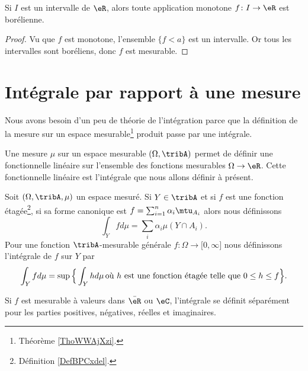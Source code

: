 \begin{corollary}
    Si \( I\) est un intervalle de \( \eR\), alors toute application monotone \( f\colon I\to \eR\) est borélienne.
\end{corollary}

\begin{proof}
    Vu que \( f\) est monotone, l'ensemble \( \{ f<a \}\) est un intervalle. Or tous les intervalles sont boréliens, donc \( f\) est mesurable.
\end{proof}

\section{Intégrale par rapport à une mesure}

Nous avons besoin d'un peu de théorie de l'intégration parce que la définition de la mesure sur un espace mesurable\footnote{Théorème \ref{ThoWWAjXzi}.} produit passe par une intégrale.

Une mesure \( \mu\) sur un espace mesurable \( (\Omega,\tribA)\) permet de définir une fonctionnelle linéaire sur l'ensemble des fonctions mesurables \( \Omega\to \eR\). Cette fonctionnelle linéaire est l'intégrale que nous allons définir à présent.

\begin{definition}  \label{DefTVOooleEst}
    Soit \( (\Omega,\tribA,\mu)\) un espace mesuré. Si \( Y\in \tribA\) et si \( f\) est une fonction étagée\footnote{Définition \ref{DefBPCxdel}.}, si sa forme canonique est \( f=\sum_{i=1}^n\alpha_i\mtu_{A_i}\) alors nous définissons
    \begin{equation}
        \int_Yfd\mu=\sum_i\alpha_i\mu(Y\cap A_i).
    \end{equation}
    Pour une fonction \( \tribA\)-mesurable générale \( f\colon \Omega\to \mathopen[ 0 , \infty \mathclose]\) nous définissons l'intégrale de \( f\) sur \( Y\) par
    \begin{equation}        \label{EqDefintYfdmu}
        \int_Yfd\mu=\sup\Big\{ \int_Yhd\mu\,\text{où \( h\) est une fonction étagée telle que \( 0\leq h\leq f\)} \Big\}.
    \end{equation}

    Si $f$ est mesurable à valeurs dans \( \bar \eR\) ou \( \eC\), l'intégrale se définit séparément pour les parties positives, négatives, réelles et imaginaires.
\end{definition}

